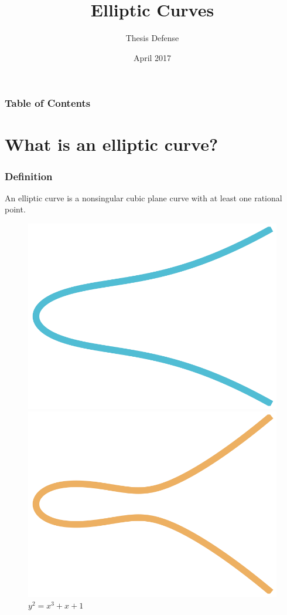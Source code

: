 \documentclass{beamer}
\title{Elliptic Curves}
\subtitle{Thesis Defense}
\institute{Tufts University}
\date{April 2017}
\begin{document}
\frame{\titlepage}

\begin{frame} 
\frametitle{Table of Contents} 
\tableofcontents
\end{frame}

\section{What is an elliptic curve?}

\begin{frame}
\frametitle{Definition}
An elliptic curve is a nonsingular 
cubic plane curve with at least one 
rational point.
\begin{figure}[H]
\begin{minipage}[b]{0.25\linewidth}
\centering
\includegraphics[width=\textwidth]{ch2-first-curves-1.png}
\caption{$y^2=x^3+x+1$}
\label{fig:a}
\end{minipage}
\hspace{0.5cm}
\begin{minipage}[b]{0.25\linewidth}
\centering
\includegraphics[width=\textwidth]{ch2-first-curves-2.png}

\end{minipage}
\end{figure}
\end{frame}
\end{document}
